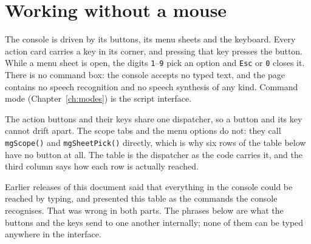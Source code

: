 {\small\noindent{}}


\section{Working without a mouse}
The console is driven by its buttons, its menu sheets and the keyboard. Every
action card carries a key in its corner, and pressing that key presses the
button. While a menu sheet is open, the digits \texttt{1}--\texttt{9} pick an
option and \texttt{Esc} or \texttt{0} closes it. There is no command box: the
console accepts no typed text, and the page contains no speech recognition and
no speech synthesis of any kind. Command mode (Chapter~\ref{ch:modes}) is the
script interface.

The action buttons and their keys share one dispatcher, so a button and its key
cannot drift apart. The scope tabs and the menu options do not: they call
\texttt{mgScope()} and \texttt{mgSheetPick()} directly, which is why six rows of
the table below have no button at all. The table is the dispatcher as the code
carries it, and the third column says how each row is actually reached.

\begin{notebox}
Earlier releases of this document said that everything in the console could be
reached by typing, and presented this table as the commands the console
recognises. That was wrong in both parts. The phrases below are what the buttons
and the keys send to one another internally; none of them can be typed anywhere
in the interface.
\end{notebox}

